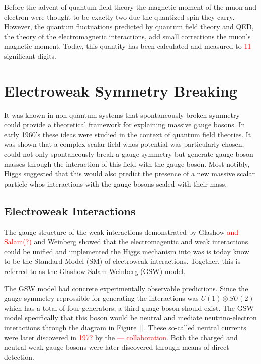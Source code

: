 Before the advent of quantum field theory the magnetic moment of the 
muon and electron were thought to be exactly two due the quantized spin 
they carry.  However, the quantum fluctuations predicted by quantum field 
theory and QED, the theory of the electromagnetic interactions, add small 
corrections the muon's magnetic moment. Today, this quantity has been calculated 
and measured to \textcolor{red}{11} significant digits.  

\section{Electroweak Symmetry Breaking}
\label{sec:Electroweak Symmetry Breaking}

It was known in non-quantum systems that spontaneously broken symmetry
could provide a theoretical framework for explaining massive gauge 
bosons\cite{}. In early 1960's these ideas were studied in the context
of quantum field theories.  It was shown that a complex scalar field 
whos potential was particularly chosen, could not only spontaneously 
break a gauge symmetry but generate gauge boson masses through the 
interaction of this field with the gauge boson\cite{}.  Most notibly, 
Higgs suggested that this would also predict the presence of a new 
massive scalar particle whos interactions with the gauge bosons 
scaled with their mass\cite{}.  

\subsection{Electroweak Interactions}
\label{sec:Electroweak interactions}

The gauge structure of the weak interactions demonstrated by Glashow 
\textcolor{red}{and Salam(?)}\cite{} and Weinberg showed that the 
electromagentic and weak interactions could be unified and implemented
the Higgs mechanism into was is today know to be the Standard Model (SM)
of electroweak interactions.  Together, this is referred to as the 
Glashow-Salam-Weinberg (GSW) model.

The GSW model had concrete experimentally observable predictions.  Since
the gauge symmetry reprossible for generating the interactions was
$U(1)\otimes SU(2)$ which has a total of four generators, a third guage 
boson should exist.  The GSW model specifically that this boson would 
be neutral and mediate neutrino-electron interactions through the 
diagram in Figure~\ref{}.  These so-called neutral currents were later
discovered in \textcolor{red}{197?} by the \textcolor{red}{--- collaboration}.
Both the charged and neutral weak gauge bosons were later discovered
through means of direct detection\cite{}.  

